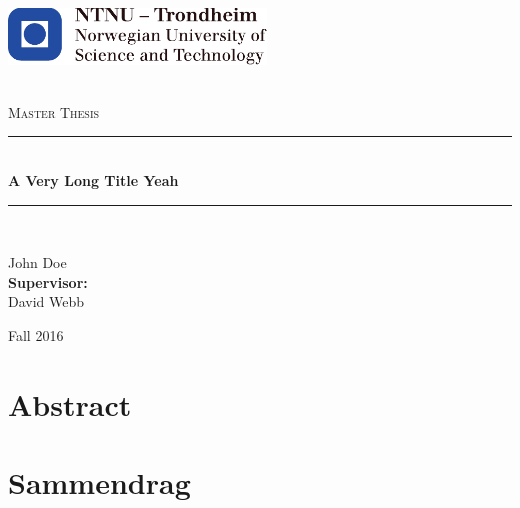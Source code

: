 \documentclass[b5paper,twoside]{book}
\begin{document}
\begin{titlepage}

\begin{center}
    \includegraphics[height=1.5cm]{images/ntnu-logo.pdf}\\[1cm] %
\end{center}
\begin{center}

~\\[1.5cm]

\textsc{\Large Master Thesis }\\[0.5cm]

\hrule ~\\[0.4cm]
{\huge \bfseries A Very Long
Title Yeah}\\[0.5cm]		%
\hrule ~\\[1.5cm]

\begin{minipage}{0.4\textwidth}
  \centering
	  \large
		  John Doe\\
		  \vspace{2.5cm}
		  \vspace{1.5cm}
		  \textbf{Supervisor:}  \\ David Webb %
\end{minipage}

\vfill

{\large Fall 2016}

\thispagestyle{empty}

\end{center}
\end{titlepage}

\setcounter{page}{0}
\chapter*{Abstract}


\chapter*{Sammendrag}

\end{document}
